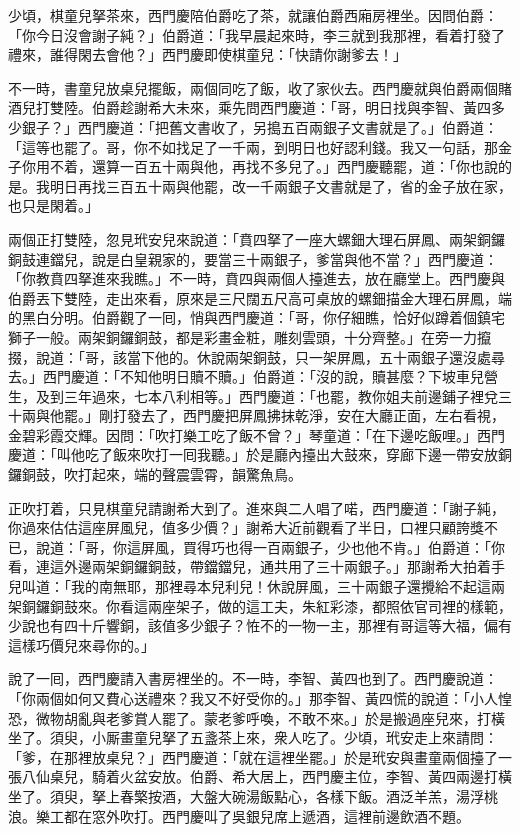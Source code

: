少頃，棋童兒拏茶來，西門慶陪伯爵吃了茶，就讓伯爵西廂房裡坐。因問伯爵：「你今日沒會謝子純？」伯爵道：「我早晨起來時，李三就到我那裡，看着打發了禮來，誰得閑去會他？」西門慶即使棋童兒：「快請你謝爹去！」

不一時，書童兒放桌兒擺飯，兩個同吃了飯，收了家伙去。西門慶就與伯爵兩個賭酒兒打雙陸。伯爵趁謝希大未來，乘先問西門慶道：「哥，明日找與李智、黃四多少銀子？」西門慶道：「把舊文書收了，另搗五百兩銀子文書就是了。」伯爵道：「這等也罷了。哥，你不如找足了一千兩，到明日也好認利錢。我又一句話，那金子你用不着，還算一百五十兩與他，再找不多兒了。」西門慶聽罷，道：「你也說的是。我明日再找三百五十兩與他罷，改一千兩銀子文書就是了，省的金子放在家，也只是閑着。」

兩個正打雙陸，忽見玳安兒來說道：「賁四拏了一座大螺鈿大理石屏鳳、兩架銅鑼銅鼓連鐺兒，說是白皇親家的，要當三十兩銀子，爹當與他不當？」西門慶道：「你教賁四拏進來我瞧。」不一時，賁四與兩個人擡進去，放在廳堂上。西門慶與伯爵丟下雙陸，走出來看，原來是三尺闊五尺高可桌放的螺鈿描金大理石屏鳳，端的黑白分明。伯爵觀了一囘，悄與西門慶道：「哥，你仔細瞧，恰好似蹲着個鎮宅獅子一般。兩架銅鑼銅鼓，都是彩畫金粧，雕刻雲頭，十分齊整。」在旁一力攛掇，說道：「哥，該當下他的。休說兩架銅鼓，只一架屏鳳，五十兩銀子還沒處尋去。」西門慶道：「不知他明日贖不贖。」伯爵道：「沒的說，贖甚麼？下坡車兒營生，及到三年過來，七本八利相等。」西門慶道：「也罷，教你姐夫前邊鋪子裡兌三十兩與他罷。」剛打發去了，西門慶把屏鳳拂抹乾淨，安在大廳正面，左右看視，金碧彩霞交輝。因問：「吹打樂工吃了飯不曾？」琴童道：「在下邊吃飯哩。」西門慶道：「叫他吃了飯來吹打一囘我聽。」於是廳內擡出大鼓來，穿廊下邊一帶安放銅鑼銅鼓，吹打起來，端的聲震雲霄，韻驚魚鳥。

正吹打着，只見棋童兒請謝希大到了。進來與二人唱了喏，西門慶道：「謝子純，你過來估估這座屏風兒，值多少價？」謝希大近前觀看了半日，口裡只顧誇獎不已，說道：「哥，你這屏風，買得巧也得一百兩銀子，少也他不肯。」伯爵道：「你看，連這外邊兩架銅鑼銅鼓，帶鐺鐺兒，通共用了三十兩銀子。」那謝希大拍着手兒叫道：{}「我的南無耶，那裡尋本兒利兒！休說屏風，三十兩銀子還攪給不起這兩架銅鑼銅鼓來。你看這兩座架子，做的這工夫，朱紅彩漆，都照依官司裡的樣範，少說也有四十斤響銅，該值多少銀子？恠不的一物一主，那裡有哥這等大福，偏有這樣巧價兒來尋你的。」

說了一囘，西門慶請入書房裡坐的。不一時，李智、黃四也到了。西門慶說道：「你兩個如何又費心送禮來？我又不好受你的。」那李智、黃四慌的說道：「小人惶恐，微物胡亂與老爹賞人罷了。蒙老爹呼喚，不敢不來。」於是搬過座兒來，打橫坐了。須臾，小厮畫童兒拏了五盞茶上來，衆人吃了。少頃，玳安走上來請問：「爹，在那裡放桌兒？」西門慶道：「就在這裡坐罷。」於是玳安與畫童兩個擡了一張八仙桌兒，騎着火盆安放。伯爵、希大居上，西門慶主位，李智、黃四兩邊打橫坐了。須臾，拏上春檠按酒，大盤大碗湯飯點心，各樣下飯。酒泛羊羔，湯浮桃浪。樂工都在窓外吹打。西門慶叫了吳銀兒席上遞酒，這裡前邊飲酒不題。


